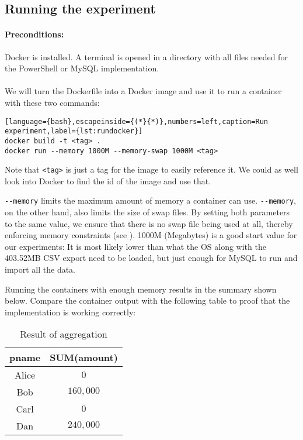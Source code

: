 \subsection{Running the experiment}

\paragraph{Preconditions:}
\gls{Docker} is installed. A terminal is opened in a directory
with all files needed for the \gls{PowerShell} or \gls{MySQL} implementation. \\\\
We will turn the Dockerfile into a \gls{Docker} image and use it to
run a container with these two commands:

\begin{lstlisting}[language={bash},escapeinside={(*}{*)},numbers=left,caption=Run experiment,label={lst:rundocker}]
docker build -t <tag> .
docker run --memory 1000M --memory-swap 1000M <tag>
\end{lstlisting}
Note that \verb+<tag>+ is just a tag for the image to easily reference it.
We could as well look into \gls{Docker} to find the id of the image and use that.

\verb+--memory+ limits the maximum amount of memory
a container can use. \verb+--memory+, on the other hand, also limits
the size of \gls{swap} files. By setting both parameters to the same value,
we ensure that there is no \gls{swap} file being used at all, thereby
enforcing memory constraints (see \cite{dockerMem}). 1000M (Megabytes) is a good start value
for our experiments: It is most likely lower than what the \gls{OS} along with the 403.52MB
\gls{CSV} export need to be loaded, but just enough for \gls{MySQL} to run and import
all the data.

Running the containers with enough memory results in the summary shown
below. Compare the container output with the following table to proof
that the implementation is working correctly:

\begin{table}[htbp]
    \centering
    \begin{tabular}{|c|c|}
        \hline
        pname & SUM(amount) \\ \hline\hline
        Alice & $0$ \\ \hline
        Bob   & $160,000$ \\ \hline
        Carl  & $0$ \\ \hline
        Dan   & $240,000$ \\ \hline
    \end{tabular}
    \caption{Result of aggregation}
    \label{Result of aggregation}
\end{table}

